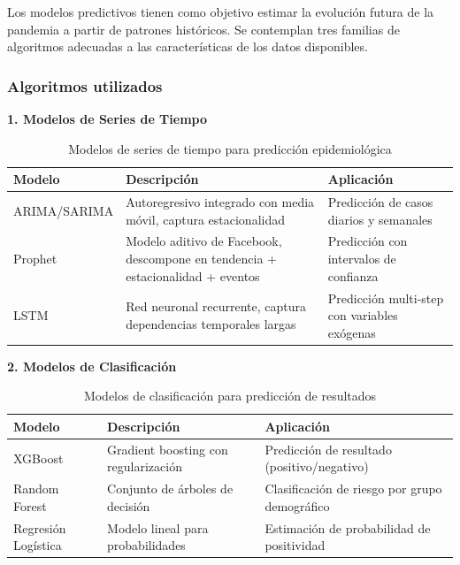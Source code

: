 \documentclass[12pt,a4paper]{article}
\begin{document}
Los modelos predictivos tienen como objetivo estimar la evolución futura de la pandemia a partir de patrones históricos. Se contemplan tres familias de algoritmos adecuadas a las características de los datos disponibles.

\subsubsection{Algoritmos utilizados}\label{algoritmos-utilizados}


\textbf{1. Modelos de Series de Tiempo}

\begin{table}[H]
    \centering
    \caption{Modelos de series de tiempo para predicción epidemiológica}
    \begin{tabular}{@{}lp{5.5cm}p{5.5cm}@{}}
        \toprule
        \textbf{Modelo} & \textbf{Descripción}                                                           & \textbf{Aplicación}                          \\
        \midrule
        ARIMA/SARIMA    & Autoregresivo integrado con media móvil, captura estacionalidad                & Predicción de casos diarios y semanales      \\[6pt]
        Prophet         & Modelo aditivo de Facebook, descompone en tendencia + estacionalidad + eventos & Predicción con intervalos de confianza       \\[6pt]
        LSTM            & Red neuronal recurrente, captura dependencias temporales largas                & Predicción multi-step con variables exógenas \\
        \bottomrule
    \end{tabular}
\end{table}

\textbf{2. Modelos de Clasificación}

\begin{table}[H]
    \centering
    \caption{Modelos de clasificación para predicción de resultados}
    \begin{tabular}{@{}lp{5.5cm}p{5.5cm}@{}}
        \toprule
        \textbf{Modelo}     & \textbf{Descripción}                 & \textbf{Aplicación}                           \\
        \midrule
        XGBoost             & Gradient boosting con regularización & Predicción de resultado (positivo/negativo)   \\[6pt]
        Random Forest       & Conjunto de árboles de decisión      & Clasificación de riesgo por grupo demográfico \\[6pt]
        Regresión Logística & Modelo lineal para probabilidades    & Estimación de probabilidad de positividad     \\
        \bottomrule
    \end{tabular}
\end{table}
\end{document}

